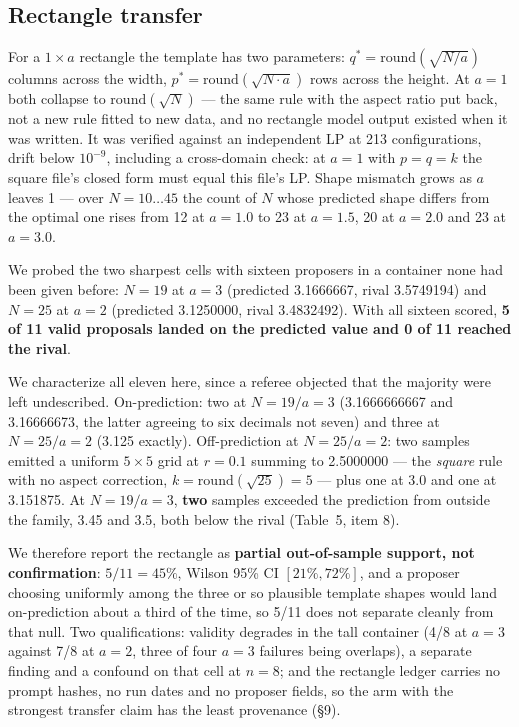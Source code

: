 \documentclass[11pt]{article}
\begin{document}
\subsection{Rectangle transfer}

For a $1 \times a$ rectangle the template has two parameters: $q^{*} = \mathrm{round}(\sqrt{N/a})$ columns across the
width, $p^{*} = \mathrm{round}(\sqrt{N \cdot a})$ rows across the height. At $a = 1$ both collapse to $\mathrm{round}(\sqrt{N})$ --- the
same rule with the aspect ratio put back, not a new rule fitted to new data, and no rectangle
model output existed when it was written. It was verified against an independent LP at 213
configurations, drift below $10^{-9}$, including a cross-domain check: at $a = 1$ with $p = q = k$ the
square file's closed form must equal this file's LP. Shape mismatch grows as $a$ leaves 1 --- over
$N = 10\ldots45$ the count of $N$ whose predicted shape differs from the optimal one rises from 12 at
$a = 1.0$ to 23 at $a = 1.5$, 20 at $a = 2.0$ and 23 at $a = 3.0$.

We probed the two sharpest cells with sixteen proposers in a container none had been given
before: $N = 19$ at $a = 3$ (predicted 3.1666667, rival 3.5749194) and $N = 25$ at $a = 2$ (predicted
3.1250000, rival 3.4832492). With all sixteen scored, \textbf{5 of 11 valid proposals landed on the
predicted value and 0 of 11 reached the rival}.

We characterize all eleven here, since a referee objected that the majority were left
undescribed. On-prediction: two
at $N = 19/a = 3$ (3.1666666667 and 3.16666673, the latter agreeing to six decimals not seven) and
three at $N = 25/a = 2$ (3.125 exactly). Off-prediction at $N = 25/a = 2$: two samples emitted a
uniform $5\times5$ grid at $r = 0.1$ summing to 2.5000000 --- the \textit{square} rule with no aspect correction,
$k = \mathrm{round}(\sqrt{25}) = 5$ --- plus one at 3.0 and one at 3.151875. At $N = 19/a = 3$, \textbf{two} samples
exceeded the prediction from outside the family, 3.45 and 3.5, both below the rival (Table~5,
item 8).

We therefore report the rectangle as \textbf{partial out-of-sample support, not confirmation}:
$5/11 = 45\%$, Wilson 95\% CI $[21\%, 72\%]$, and a proposer choosing uniformly among the three or so
plausible template shapes would land on-prediction about a third of the time, so 5/11 does not
separate cleanly from that null. Two qualifications: validity degrades in the tall container
(4/8 at $a = 3$ against 7/8 at $a = 2$, three of four $a = 3$ failures being overlaps), a separate
finding and a confound on that cell at $n = 8$; and the rectangle ledger carries no prompt hashes,
no run dates and no proposer fields, so the arm with the strongest transfer claim has the least
provenance (\S9).
\end{document}
